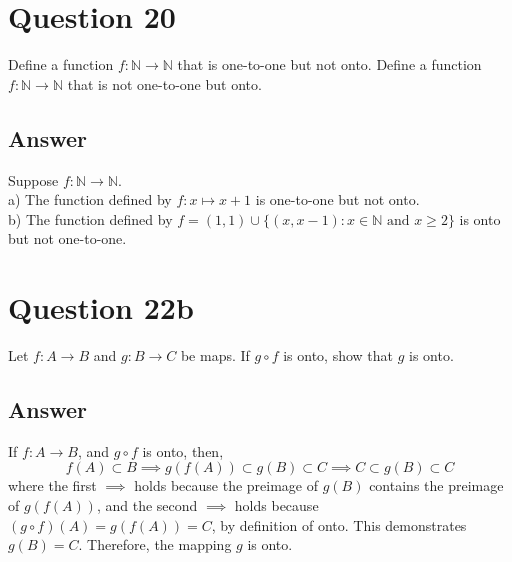 \documentclass[
	12pt, %
]{fphw}
\newcommand\set[1]{\{#1\}}
\newcommand\qed{\text{$\blacksquare$}}
\newcommand\N{\mathbb{N}}
\begin{document}
\newpage

\section*{Question 20}

\begin{problem}
Define a function $f : \N \to \N$ that is one-to-one but not onto.
Define a function $f : \N \to \N$ that is not one-to-one but onto.
\end{problem}


\subsection*{Answer}
Suppose $f : \N \to \N$.\\
a) The function defined by $f : x \mapsto x + 1$ is one-to-one but not onto.\\
b) The function defined by $f = (1,1) \cup \set{(x, x-1) : x \in \N \text{ and } x \ge 2}$ is onto but not one-to-one.


\section*{Question 22b}

\begin{problem}
Let  $f: A \to B$ and $g: B \to C$ be maps. If $g \circ f$ is onto, show that $g$ is onto.
\end{problem}


\subsection*{Answer}
If $f: A \to B$, and $g \circ f$ is onto, then,
$$f(A) \subset B \implies g(f(A)) \subset g(B) \subset C \implies C \subset g(B) \subset C$$
where the first $\implies$ holds because the preimage of $g(B)$ contains the preimage of $g(f(A))$, and the second $\implies$ holds because $(g \circ f) (A) = g(f(A)) = C$, by definition of onto. This demonstrates $g(B) = C$. Therefore, the mapping $g$ is onto. \qed
\end{document}

